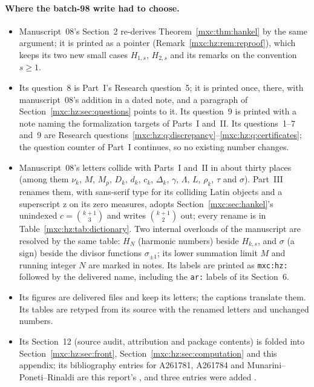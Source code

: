 \documentclass[11pt]{article}
\numberwithin{equation}{section}
\theoremstyle{definition}
\theoremstyle{remark}
\begin{document}
\paragraph{Where the batch-98 write had to choose.}
\begin{itemize}
\item Manuscript~08's Section~2 re-derives Theorem~\ref{mxc:thm:hankel} by
 the same argument; it is printed as a pointer
 (Remark~\ref{mxc:hz:rem:reproof}), which keeps its two new small cases
 $H_{1,s}$, $H_{2,s}$ and its remarks on the convention $s\ge1$.
\item Its question~8 is Part~I's Research question~5; it is printed once,
 there, with manuscript~08's addition in a dated note, and a paragraph of
 Section~\ref{mxc:hz:sec:questions} points to it. Its question~9 is printed
 with a note naming the formalization targets of Parts~I and~II. Its
 questions~1--7 and~9 are Research
 questions~\ref{mxc:hz:q:discrepancy}--\ref{mxc:hz:q:certificates}; the
 question counter of Part~I continues, so no existing number changes.
\item Manuscript~08's letters collide with Parts~I and~II in about thirty
 places (among them $\nu_k$, $M$, $M_p$, $D_k$, $d_k$, $c_k$, $\Delta_k$,
 $\gamma$, $\Lambda$, $L$, $\rho_k$, $\tau$ and $\sigma$). Part~III renames
 them, with sans-serif type for its colliding Latin objects and a
 superscript $\mathrm z$ on its zero measures, adopts Section~\ref{mxc:sec:hankel}'s
 unindexed $c=\binom{k+1}3$ and writes $\binom{k+1}2$ out; every rename is
 in Table~\ref{mxc:hz:tab:dictionary}. Two internal overloads of the
 manuscript are resolved by the same table: $H_N$ (harmonic numbers) beside
 $H_{k,s}$, and $\sigma$ (a sign) beside the divisor functions
 $\sigma_{\pm1}$; its lower summation limit $M$ and running integer $N$ are
 marked in notes. Its labels are printed as \texttt{mxc:hz:} followed by
 the delivered name, including the \texttt{ar:} labels of its Section~6.
\item Its figures are delivered files and keep its letters; the captions
 translate them. Its tables are retyped from its source with the renamed
 letters and unchanged numbers.
\item Its Section~12 (source audit, attribution and package contents) is
 folded into Section~\ref{mxc:hz:sec:front}, Section~\ref{mxc:hz:sec:computation}
 and this appendix; its bibliography entries for A261781, A261784 and
 Munarini--Poneti--Rinaldi are this report's \cite{oeis781,oeis784,mpr2009},
 and three entries were added \cite{hzpsi,hztoth,hzProveIt}.

\end{itemize}
\end{document}
